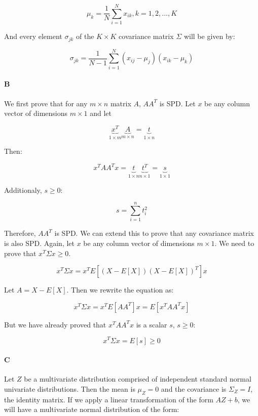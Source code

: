 \documentclass[12pt]{article}
\begin{document}
\begin{equation}
\mu_k = \frac{1}{N}\displaystyle\sum_{i=1}^{N}{x_{ik}}, k=1,2,...,K
\end{equation}

And every element $\sigma_{jk}$ of the $K \times K$ covariance matrix $\Sigma$ will be given by:

\begin{equation}
\sigma_{jk}=\frac{1}{N-1}\displaystyle\sum_{i=1}^{N}{(x_{ij}-\mu_j)(x_{ik}-\mu_{k})}
\end{equation}

\paragraph{B}

We first prove that for any $m \times n$ matrix $A$, $AA^T$ is SPD. Let $x$ be any column vector of dimensions $m\times1$ and let

\[
\underbrace{x^T}_{1\times m}\underbrace{A}_{m\times n}=\underbrace{t}_{1\times n}
\]

Then:

\[
x^TAA^Tx = \underbrace{t}_{1\times n}\underbrace{t^T}_{n \times 1} = \underbrace{s}_{1\times 1}
\]

Additionaly, $s\geq 0$:

\[s = \displaystyle\sum_{i=1}^n{t_i^2}\]

Therefore, $AA^T$ is SPD. We can extend this to prove that any covariance matrix is also SPD. Again, let $x$ be any column vector of dimensions $m\times1$. We need to prove that $x^T\Sigma x \geq 0$.

\[
x^T\Sigma x=x^TE\left[\left(X-E[X]\right)\left(X-E[X]\right)^T\right]x
\]

Let $A=X-E[X]$. Then we rewrite the equation as:

\[
x^T\Sigma x=x^TE\left[AA^T\right]x = E\left[x^TAA^Tx\right]
\]

But we have already proved that $x^TAA^Tx$ is a scalar $s$, $s \geq 0$:

\[
x^T\Sigma x  =E\left[s\right] \geq 0
\]

\paragraph{C}
Let $Z$ be a multivariate distribution comprised of independent standard normal univariate distributions. Then the mean is $\mu_Z = 0$ and the covariance is $\Sigma_Z=I$, the identity matrix. If we apply a linear transformation of the form $AZ + b$, we will have a multivariate normal distribution of the form:
\end{document}

